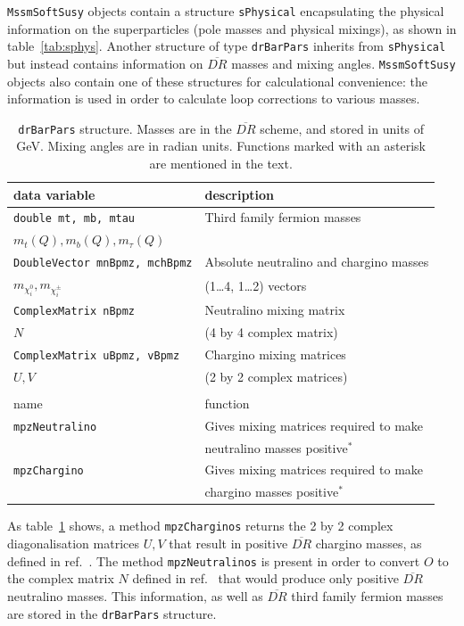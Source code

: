 \documentclass{article}
\def\code#1{\small{\tt #1}\normalsize}
\begin{document}
\code{MssmSoftSusy} objects contain a structure \code{sPhysical} encapsulating
the physical information on the superparticles (pole masses and physical
mixings), as shown in table~\ref{tab:sphys}.  
Another structure of type \code{drBarPars} inherits from \code{sPhysical} but
instead contains information on $\overline{DR}$ masses and mixing angles. 
\code{MssmSoftSusy} objects
also contain one of these structures for calculational convenience:
the information is used in order
to calculate loop corrections to various masses.
\begin{table}\begin{center}\begin{tabular}{ll} 
data variable & description \\ \hline
\code{double mt, mb, mtau} & Third family fermion masses \\
$m_t(Q), m_b(Q), m_\tau(Q)$ &                     \\ \hline
\code{DoubleVector mnBpmz, mchBpmz} & Absolute neutralino and chargino masses\\
$m_{\chi_i^0}, m_{\chi^\pm_i}$ & (1\ldots4, 1\ldots2) vectors \\ \hline
\code{ComplexMatrix nBpmz} & Neutralino mixing matrix \\
$N$          & (4 by 4 complex matrix) \\ \hline
\code{ComplexMatrix uBpmz, vBpmz} & Chargino mixing matrices \\
$U, V$       & (2 by 2 complex matrices) \\ \hline
 & \\
name         & function \\ \hline
\code{mpzNeutralino} & Gives mixing matrices required to make \\ & neutralino
masses positive$^*$\\ 
\code{mpzChargino} & Gives mixing matrices required to make \\ & chargino
masses positive$^*$\\ 
\end{tabular}
\caption{\label{tab:drbarpars}\code{drBarPars} structure. Masses are in the $\overline{DR}$ scheme, and
  stored in units of GeV. Mixing angles are in radian units. Functions marked
  with an asterisk are mentioned in the text.}\end{center}\end{table}
As table~\ref{tab:drbarpars} shows, a
method \code{mpzCharginos} returns the 2 by 2 complex diagonalisation
matrices $U,V$ that result in positive $\overline{DR}$ chargino masses, as
defined in ref.~\cite{Pierce:1997zz}. 
The method
\code{mpzNeutralinos} is present in order to convert $O$ to the complex matrix
$N$ defined in ref.~\cite{Pierce:1997zz} that would produce only positive
$\overline{DR}$ neutralino masses. This information, as well as
$\overline{DR}$ third family
fermion masses are stored in the \code{drBarPars} structure.
\end{document}
